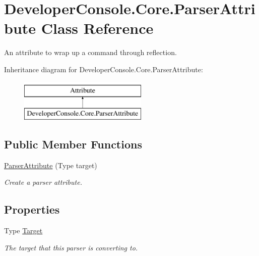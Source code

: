 \hypertarget{class_developer_console_1_1_core_1_1_parser_attribute}{}\section{Developer\+Console.\+Core.\+Parser\+Attribute Class Reference}
\label{class_developer_console_1_1_core_1_1_parser_attribute}


An attribute to wrap up a command through reflection.  


Inheritance diagram for Developer\+Console.\+Core.\+Parser\+Attribute\+:\begin{figure}[H]
\begin{center}
\leavevmode
\includegraphics[height=2.000000cm]{class_developer_console_1_1_core_1_1_parser_attribute}
\end{center}
\end{figure}
\subsection*{Public Member Functions}
\begin{DoxyCompactItemize}
\item 
\hyperlink{class_developer_console_1_1_core_1_1_parser_attribute_a9446caab4b1fddfc1846bd460ea9fe69}{Parser\+Attribute} (Type target)
\begin{DoxyCompactList}\small\item\em Create a parser attribute. \end{DoxyCompactList}\end{DoxyCompactItemize}
\subsection*{Properties}
\begin{DoxyCompactItemize}
\item 
Type \hyperlink{class_developer_console_1_1_core_1_1_parser_attribute_a140a6bf8b0a7c1f555c08fb33d90f850}{Target}
\begin{DoxyCompactList}\small\item\em The target that this parser is converting to. \end{DoxyCompactList}\end{DoxyCompactItemize}


